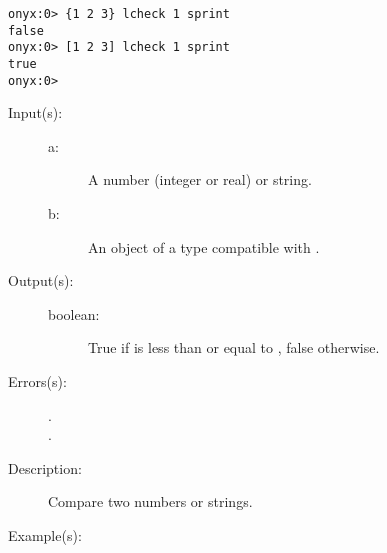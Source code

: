 \begin{description}
\begin{description}
\begin{verbatim}
onyx:0> {1 2 3} lcheck 1 sprint
false
onyx:0> [1 2 3] lcheck 1 sprint
true
onyx:0>
		\end{verbatim}
	\end{description}
\label{systemdict:le}
\item[{\onyxop{a b}{le}{boolean}}: ]
	\begin{description}\item[]
	\item[Input(s): ]
		\begin{description}\item[]
		\item[a: ]
			A number (integer or real) or string.
		\item[b: ]
			An object of a type compatible with .
		\end{description}
	\item[Output(s): ]
		\begin{description}\item[]
		\item[boolean: ]
			True if  is less than or equal to ,
			false otherwise.
		\end{description}
	\item[Errors(s): ]
		\begin{description}\item[]
		\item[.]
		\item[.]
		\end{description}
	\item[Description: ]
		Compare two numbers or strings.
	\item[Example(s): ]\begin{verbatim}


\end{verbatim}
\end{description}
\end{description}
